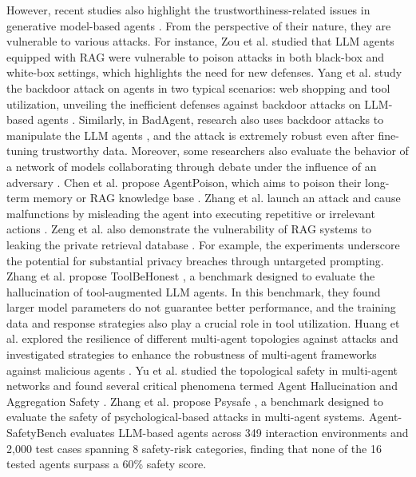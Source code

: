 However, recent studies also highlight the trustworthiness-related issues in generative model-based agents \cite{he2024emerged, gan2024navigating, shavit2023practices,zhang2024agentsafetybench,yin2024safeagentbench, andriushchenko2024agentharm}. From the perspective of their nature, they are vulnerable to various attacks. For instance, Zou et al. studied that LLM agents equipped with RAG were vulnerable to poison attacks \cite{zou2024poisonedrag, xue2024badrag} in both black-box and white-box settings, which highlights the need for new defenses. Yang et al. study the backdoor attack on agents in two typical scenarios: web shopping and tool utilization, unveiling the inefficient defenses against backdoor attacks on LLM-based agents \cite{yang2024watch}. Similarly, in BadAgent, research also uses backdoor attacks to manipulate the LLM agents \cite{wang2024badagent}, and the attack is extremely robust even after fine-tuning trustworthy data. Moreover, some researchers also evaluate the behavior of a network of models collaborating through debate under the influence of an adversary \cite{amayuelas2024multiagent}. Chen et al. propose AgentPoison, which aims to poison their long-term memory or RAG knowledge base \cite{chen2024agentpoison}. Zhang et al. launch an attack and cause malfunctions by misleading the agent into executing repetitive or irrelevant actions \cite{zhang2024breaking}. Zeng et al. also demonstrate the vulnerability of RAG systems to leaking the private retrieval database \cite{zeng2024good}. For example, the experiments underscore the potential for substantial privacy breaches through untargeted prompting. Zhang et al. propose ToolBeHonest \cite{zhang2024toolbehonest}, a benchmark designed to evaluate the hallucination of tool-augmented LLM agents. In this benchmark, they found larger model parameters do not guarantee better performance, and the training data and response strategies also play a crucial role in tool utilization. Huang et al. explored the resilience of different multi-agent topologies against attacks and investigated strategies to enhance the robustness of multi-agent frameworks against malicious agents \cite{huang2024resilience}. Yu et al. studied the topological safety in multi-agent networks and found several critical phenomena termed Agent Hallucination and Aggregation Safety \cite{yu2024netsafe}. Zhang et al. propose Psysafe \cite{zhang2024psysafe}, a benchmark designed to evaluate the safety of psychological-based attacks in multi-agent systems.
Agent-SafetyBench \cite{zhang2024agentsafetybench} evaluates LLM-based agents across 349 interaction environments and 2,000 test cases spanning 8 safety-risk categories, finding that none of the 16 tested agents surpass a 60\% safety score.
